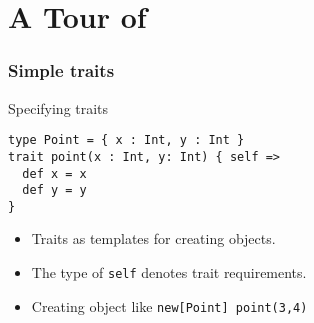 \documentclass{beamer}
\begin{document}







\section{A Tour of \name}

\begin{frame}[fragile]
  \frametitle{Simple traits}

    \begin{exampleblock}{Specifying traits}

\begin{lstlisting}
type Point = { x : Int, y : Int }
trait point(x : Int, y: Int) { self =>
  def x = x
  def y = y
}
\end{lstlisting}

    \end{exampleblock}

      \begin{itemize}
      \item Traits as templates for creating objects.
      \item The type of \lstinline{self} denotes trait requirements.
      \item Creating object like \lstinline{new[Point] point(3,4)}
      \end{itemize}


\end{frame}
\end{document}
